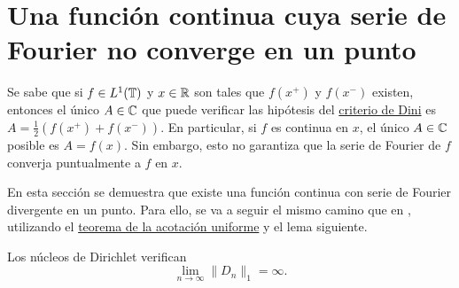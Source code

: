 \documentclass[a4paper, 12pt, oneside]{book}
\begin{document}
\section{Una función continua cuya serie de Fourier no converge en un punto}

Se sabe que si $f \in L^1(\mathbb T)$ y $x \in \mathbb R$ son tales que $f(x^+)$ y $f(x^-)$ existen, entonces el único $A \in \mathbb C$ que puede verificar las hipótesis del \hyperref[1.2.10]{\color{blue}criterio de Dini} es $A = \frac{1}{2}(f(x^+)+f(x^-))$. En particular, si $f$ es continua en $x$, el único $A \in \mathbb C$ posible es $A = f(x)$. Sin embargo, esto no garantiza que la serie de Fourier de $f$ converja puntualmente a $f$ en $x$.

En esta sección se demuestra que existe una función continua con serie de Fourier divergente en un punto. Para ello, se va a seguir el mismo camino que en \cite{fierros}, utilizando el \hyperref[1.3.1]{\color{blue}teorema de la acotación uniforme} y el lema siguiente.

\begin{lemma}\label{2.1.1}
    Los núcleos de Dirichlet verifican \[\lim_{n \to \infty} \|D_n\|_1 = \infty.\]
\end{lemma}
\end{document}
